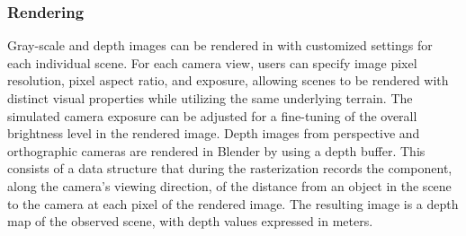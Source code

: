 \subsubsection{Rendering}
\label{subsubsec:rendering}
Gray-scale and depth images can be rendered in with customized settings for each individual scene. For each camera view, users can specify image pixel resolution, pixel aspect ratio, and exposure, allowing scenes to be rendered with distinct visual properties while utilizing the same underlying terrain. The simulated camera exposure can be adjusted for a fine-tuning of the overall brightness level in the rendered image. Depth images from perspective and orthographic cameras are rendered in Blender by using a depth buffer. This consists of a data structure that during the rasterization records the component, along the camera's viewing direction, of the distance from an object in the scene to the camera at each pixel of the rendered image. The resulting image is a depth map of the observed scene, with depth values expressed in meters.





